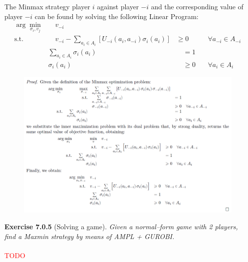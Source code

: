 \noindent
The Minmax strategy player $i$ against player $-i$ and the corresponding value of player $-i$ can be found by solving the following Linear Program:
\begin{align*}
\arg \min_{\sigma_{i}, v_j} & \quad v_{-i}\\
\text{s.t.} & \quad v_{-i}-\sum_{a_{i} \in A_{i}}\left[U_{-i}\left(a_{i}, a_{-i}\right) \sigma_{i}\left(a_{i}\right)\right] & \geqslant 0 & \quad \forall a_{-i} \in A_{-i} \\
& \sum_{a_{i} \in A_{i}} \sigma_{i}\left(a_{i}\right) & \quad =1 &\\
& \sigma_{i}\left(a_{i}\right) & \quad \geqslant  0 & \quad \forall a_{i} \in A_{i}
\end{align*}
\begin{figure}[H]
\centering
\includegraphics[width=\textwidth]{images/img_2_7_04.png}
\end{figure}
\textbf{Exercise 7.0.5} (Solving a game). \textit{Given a normal–form game with 2 players, find a Maxmin strategy by means of AMPL + GUROBI.}\\\\
\textcolor{red}{TODO}\\\\

